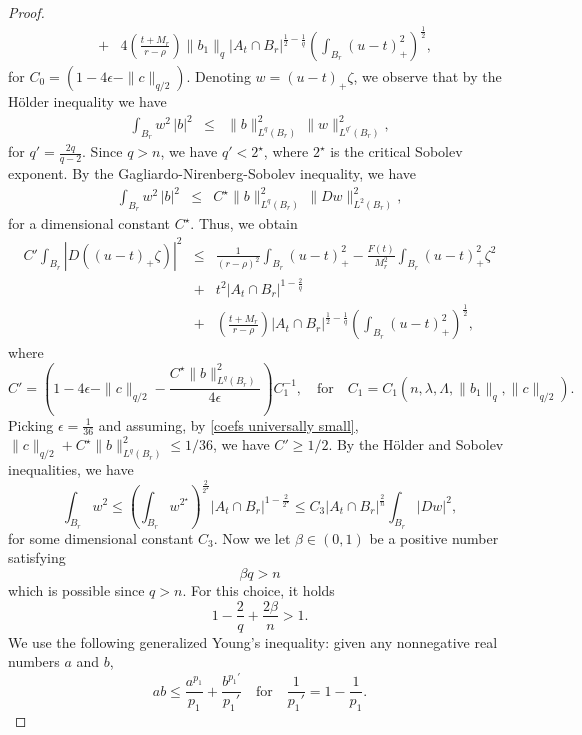 \documentclass[12pt,a4paper]{amsart}
\numberwithin{equation}{section} %
\theoremstyle{definition}
\theoremstyle{remark}
\begin{document}
\begin{proof}
\begin{eqnarray*}
    & + & 4\left(\frac{t+M_r}{r-\rho}\right)\|b_1\|_{q}|A_t \cap B_r|^{\frac{1}{2} - \frac{1}{q}}\left(\int_{B_r}(u-t)^2_+ \right)^{\frac{1}{2}},
\end{eqnarray*}
for $C_0 = (1-4\epsilon-\|c\|_{q/2})$. Denoting $w = (u-t)_+ \zeta$, we observe that by the H\"older inequality we have
\begin{eqnarray*}
    \int_{B_r}  w^2\,|b|^2 & \leq & \|b\|_{L^{q}(B_r)}^2\,\|w\|_{L^{q'}(B_r)}^2,
\end{eqnarray*}
for $q' = \frac{2q}{q-2}$. Since $q>n$, we have $q' < 2^\star$, where $2^\star$ is the critical Sobolev exponent. By the Gagliardo-Nirenberg-Sobolev inequality, we have
\begin{eqnarray*}
    \int_{B_r}  w^2\,|b|^2 & \leq & C^\star \|b\|_{L^{q}(B_r)}^2\,\|Dw\|_{L^2(B_r)}^2,
\end{eqnarray*}
for a dimensional constant $C^\star$. Thus, we obtain
\begin{eqnarray}\label{ineq in cacciop}
    C'\int_{B_r}|D\left((u-t)_+\zeta \right)|^2& \leq& \frac{1}{(r-\rho)^2} \int_{B_r} (u-t)_+^2 - \frac{F(t)}{M_r^2}\int_{B_r}(u-t)_+^2\zeta^2\\
    & + & t^2 |A_t \cap B_r|^{1-\frac{2}{q}} \nonumber \\ 
    & + & \left(\frac{t+M_r}{r-\rho}\right)|A_t \cap B_r|^{\frac{1}{2} - \frac{1}{q}}\left(\int_{B_r}(u-t)^2_+ \right)^{\frac{1}{2}}, \nonumber
\end{eqnarray}
where
$$
    C' = \left(1-4\epsilon-\|c\|_{q/2} - \frac{C^\star \|b\|_{L^{q}(B_r)}^2}{4\epsilon}\right) C_1^{-1}, \quad \mbox{for} \quad C_1 = C_1(n,\lambda,\Lambda,\|b_1\|_{q},\|c\|_{q/2}).
$$
Picking $\epsilon = \frac{1}{36}$ and assuming, by \eqref{coefs universally small}, $\|c\|_{q/2} + C^\star\|b\|_{L^{q}(B_r)}^2 \leq 1/36$, we have $C' \geq 1/2$. By the H\"older and Sobolev inequalities, we have
\begin{equation}\label{holder and sobolev in cacciopoli}
    \int_{B_r}w^2 \leq \left(\int_{B_r}w^{2^\star} \right)^{\frac{2}{2^{\star}}}|A_t \cap B_r|^{1 - \frac{2}{2^\star}} \leq C_3|A_t \cap B_r|^{\frac{2}{n}}\int_{B_r}|Dw|^2,
\end{equation}
for some dimensional constant $C_3$. Now we let $\beta \in (0,1)$ be a positive number satisfying 
$$
    \beta q > n
$$
which is possible since $q > n$. For this choice, it holds
$$
    1 - \frac{2}{q} + \frac{2\beta}{n} > 1.  
$$
We use the following generalized Young's inequality: given any nonnegative real numbers $a$ and $b$, 
$$
    ab \leq \frac{a^{p_1}}{p_1} + \frac{b^{p_1'}}{p_1'} \quad \text{for} \quad \frac{1}{p_1'} = 1 - \frac{1}{p_1}.
$$
\end{proof}
\end{document}
